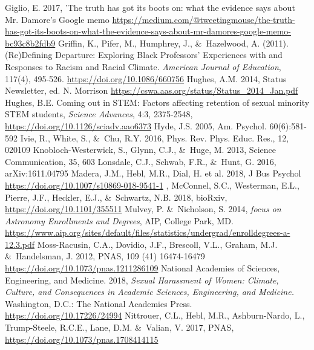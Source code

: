 \documentclass[modern]{aastex62}
\begin{document}
\begin{thebibliography}{}
 Giglio, E. 2017, 'The truth has got its boots on: what the evidence says about Mr. Damore's Google memo \url{https://medium.com/@tweetingmouse/the-truth-has-got-its-boots-on-what-the-evidence-says-about-mr-damores-google-memo-bc93c8b2fdb9}
 Griffin, K., Pifer, M., Humphrey, J., \&\ Hazelwood, A. (2011). (Re)Defining Departure: Exploring Black Professors' Experiences with and Responses to Racism and Racial Climate. {\it American Journal of Education}, 117(4), 495-526. \url{https://doi.org/10.1086/660756}
 Hughes, A.M. 2014, Status Newsletter, ed. N. Morrison \url{https://cswa.aas.org/status/Status_2014_Jan.pdf}
 Hughes, B.E. Coming out in STEM: Factors affecting retention of sexual minority STEM students, {\it Science Advances}, 4:3, 2375-2548, \url{https://doi.org/10.1126/sciadv.aao6373}
 Hyde, J.S. 2005, Am. Psychol. 60(6):581-592
 Ivie, R., White, S., \&\ Chu, R.Y. 2016, Phys. Rev. Phys. Educ. Res., 12, 020109
 Knobloch-Westerwick, S., Glynn, C.J., \&\ Huge, M. 2013, Science Communication, 35, 603
 Lonsdale, C.J., Schwab, F.R., \&\ Hunt, G. 2016, arXiv:1611.04795
 Madera, J.M., Hebl, M.R., Dial, H. et al. 2018, J Bus Psychol \url{https://doi.org/10.1007/s10869-018-9541-1}
, McConnel, S.C., Westerman, E.L., Pierre, J.F., Heckler, E.J., \&\ Schwartz, N.B. 2018, bioRxiv, \url{https://doi.org/10.1101/355511}
 Mulvey, P. \&\ Nicholson, S. 2014, {\it focus on Astronomy Enrollments and Degrees}, AIP, College Park, MD. \url{https://www.aip.org/sites/default/files/statistics/undergrad/enrolldegrees-a-12.3.pdf}
 Moss-Racusin, C.A., Dovidio, J.F., Brescoll, V.L., Graham, M.J. \&\ Handelsman, J. 2012, PNAS, 109 (41) 16474-16479 \url{https://doi.org/10.1073/pnas.1211286109}
 National Academies of Sciences, Engineering, and Medicine. 2018, {\it Sexual Harassment of Women: Climate, Culture, and Consequences in Academic Sciences, Engineering, and Medicine.} Washington, D.C.: The National Academies Press. \url{https://doi.org/10.17226/24994}
 Nittrouer, C.L., Hebl, M.R., Ashburn-Nardo, L., Trump-Steele, R.C.E., Lane, D.M. \&\ Valian, V. 2017, PNAS, \url{https://doi.org/10.1073/pnas.1708414115}

\end{thebibliography}
\end{document}
